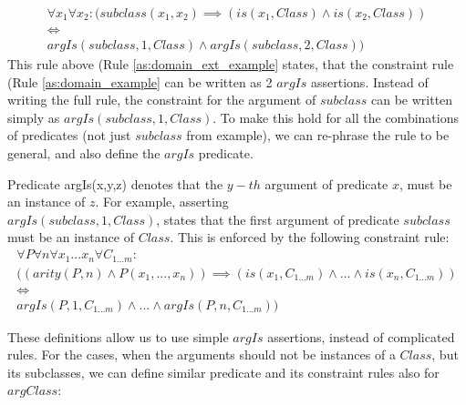 \begin{equation}\label{as:domain_ext_example}
\begin{gathered}
  \forall x_1 \forall x_2: (subclass(x_1,x_2) \implies (is(x_1,Class) \land is(x_2,Class)) \\ 
  \iff \\
  argIs(subclass,1,Class) \land argIs(subclass,2,Class))
\end{gathered}
\end{equation}
This rule above (Rule \ref{as:domain_ext_example} states, that the constraint
rule (Rule \ref{as:domain_example} can be written as 2 $argIs$ assertions.
Instead of writing the full rule, the constraint for the argument of $subclass$ can
be written simply as $argIs(subclass,1,Class)$. To make this hold for all the
combinations of predicates (not just $subclass$ from example), we can
re-phrase the rule to be general, and also define the $argIs$ predicate.

\begin{definition}\label{def:pred_argis}
Predicate argIs(x,y,z) denotes that the $y-th$ argument of predicate $x$, must
be an instance of $z$. For example, asserting \\$argIs(subclass,1, Class)$, states
that the first argument of predicate $subclass$ must be an instance of $Class$.
This is enforced by the following constraint rule:
\begin{equation}\label{as:domain_isa_constraint}
\begin{gathered}
  \forall P \forall n \forall x_1...x_n \forall C_{1...m}: \\
  ((arity(P,n) \land P(x_1,...,x_n)) \implies (is(x_1,C_{1...m}) \land ... \land is(x_n,C_{1...m})) \\ 
  \iff \\
  argIs(P,1,C_{1...m}) \land ... \land argIs(P,n,C_{1...m}))
\end{gathered}
\end{equation}
\end{definition}

These definitions allow us to use simple $argIs$ assertions, instead of
complicated rules. For the cases, when the arguments should not be instances
of a $Class$, but its subclasses, we can define similar predicate and its
constraint rules also for $argClass$:

